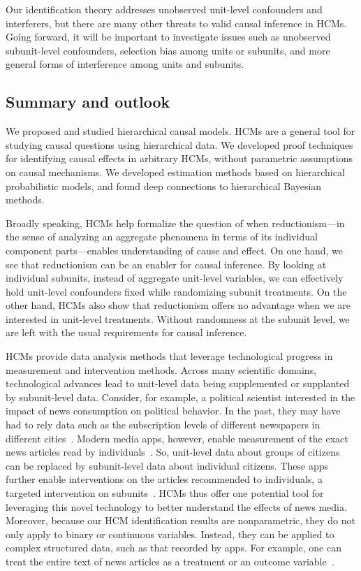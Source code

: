 \documentclass[12pt]{article}
\begin{document}
Our identification theory addresses unobserved unit-level confounders and interferers, but there are many other threats to valid causal inference in HCMs.
Going forward, it will be important to investigate issues such as unobserved subunit-level confounders, selection bias among units or subunits, and more general forms of interference among units and subunits.

\subsection{Summary and outlook}

We proposed and studied hierarchical causal models. HCMs are a general
tool for studying causal questions using hierarchical data. We
developed proof techniques for identifying causal effects in arbitrary
HCMs, without parametric assumptions on causal mechanisms. We
developed estimation methods based on hierarchical probabilistic models,
and found deep connections to hierarchical Bayesian methods.

Broadly speaking, HCMs help formalize the question of when
reductionism---in the sense of analyzing an aggregate phenomena in
terms of its individual component parts---enables understanding of
cause and effect. On one hand, we see that reductionism can be an
enabler for causal inference. By looking at individual subunits,
instead of aggregate unit-level variables, we can effectively hold
unit-level confounders fixed while randomizing subunit treatments. On
the other hand, HCMs also show that reductionism offers no advantage
when we are interested in unit-level treatments. Without randomness at
the subunit level, we are left with the usual requirements for causal
inference.









HCMs provide data analysis methods that leverage technological progress in measurement and intervention methods.
Across many scientific domains, technological advances lead to unit-level data being supplemented or supplanted by subunit-level data.
Consider, for example, a political scientist interested in the impact of news consumption on political behavior.
In the past, they may have had to rely data such as the subscription levels of different newspapers in different cities~\citep{Gentzkow2014-lm}.
Modern media apps, however, enable measurement of the exact news articles read by individuals~\citep{Gonzalez-Bailon2023-ya}.
So, unit-level data about groups of citizens can be replaced by subunit-level data about individual citizens.
These apps further enable interventions on the articles recommended to individuals, a targeted intervention on subunits~\citep{Guess2023-uv}.
HCMs thus offer one potential tool for leveraging this novel technology to better understand the effects of news media.
Moreover, because our HCM identification results are nonparametric, they do not only apply to binary or continuous variables. 
Instead, they can be applied to complex structured data, such as that recorded by apps. For example, one can treat the entire text of news articles as a treatment or an outcome variable~\citep{Feder2022-tk,Egami2022-kk}.
\end{document}
